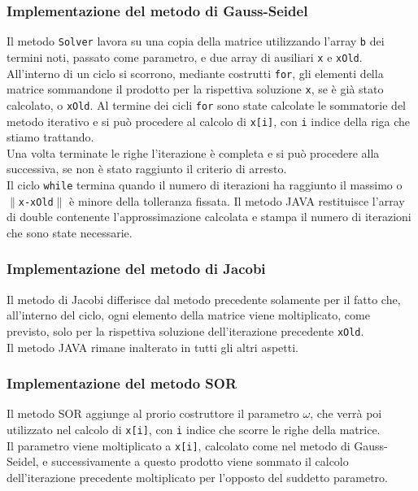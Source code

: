 \documentclass[12pt]{article}
\begin{document}
\subsubsection{Implementazione del metodo di Gauss-Seidel}
Il metodo \texttt{Solver} lavora su una copia della matrice utilizzando l'array \texttt{b} dei termini noti, passato come parametro, e due array di ausiliari \texttt{x} e \texttt{xOld}. All'interno di un ciclo si scorrono, mediante costrutti \texttt{for}, gli elementi della matrice sommandone il prodotto per la rispettiva soluzione \texttt{x}, se è già stato calcolato, o \texttt{xOld}. Al termine dei cicli \texttt{for} sono state calcolate le sommatorie del metodo iterativo e si può procedere al calcolo di \texttt{x[i]}, con \texttt{i} indice della riga che stiamo trattando. \\Una volta terminate le righe l'iterazione è completa e si può procedere alla successiva, se non è stato raggiunto il criterio di arresto.  \\Il ciclo \texttt{while} termina quando il numero di iterazioni ha raggiunto il massimo o \(\|\)\texttt{x-xOld}\(\|\) è minore della tolleranza fissata. Il metodo JAVA restituisce l'array di double contenente l'approssimazione calcolata e stampa il numero di iterazioni che sono state necessarie.\\

\subsubsection{Implementazione del metodo di Jacobi}
Il metodo di Jacobi differisce dal metodo precedente solamente per il fatto che, all'interno del ciclo, ogni elemento della matrice viene moltiplicato, come previsto, solo per la rispettiva soluzione dell'iterazione precedente \texttt{xOld}. \\Il metodo JAVA rimane inalterato in tutti gli altri aspetti.\\

\subsubsection{Implementazione del metodo SOR}
Il metodo SOR aggiunge al prorio costruttore il parametro \(\omega\), che verrà poi utilizzato nel calcolo di \texttt{x[i]}, con \texttt{i} indice che scorre le righe della matrice. \\Il parametro viene moltiplicato a \texttt{x[i]}, calcolato come nel metodo di Gauss-Seidel, e successivamente a questo prodotto viene sommato il calcolo dell'iterazione precedente moltiplicato per l'opposto del suddetto parametro.\\
\end{document}
